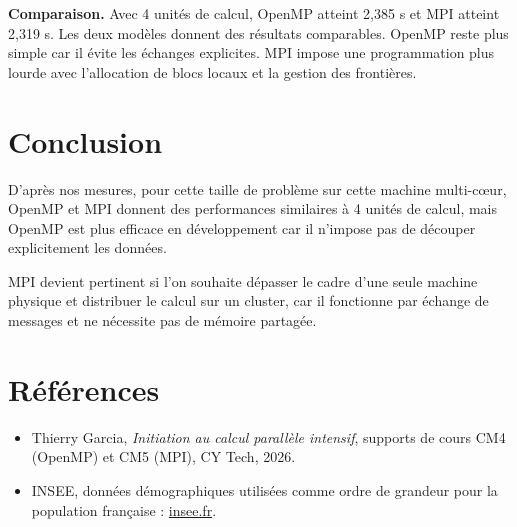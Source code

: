 \documentclass[a4paper,12pt]{article}
\begin{document}
\textbf{Comparaison.} Avec 4 unités de calcul, OpenMP atteint 2,385 s et MPI atteint 2,319 s. Les deux modèles donnent des résultats comparables. OpenMP reste plus simple car il évite les échanges explicites. MPI impose une programmation plus lourde avec l'allocation de blocs locaux et la gestion des frontières.
 
\section{Conclusion}
 
D'après nos mesures, pour cette taille de problème sur cette machine multi-cœur, OpenMP et MPI donnent des performances similaires à 4 unités de calcul, mais OpenMP est plus efficace en développement car il n'impose pas de découper explicitement les données.
 
MPI devient pertinent si l'on souhaite dépasser le cadre d'une seule machine physique et distribuer le calcul sur un cluster, car il fonctionne par échange de messages et ne nécessite pas de mémoire partagée.

\newpage
\section{Références}

\begin{itemize}
	\item Thierry Garcia, \textit{Initiation au calcul parallèle intensif},
	supports de cours CM4 (OpenMP) et CM5 (MPI), CY Tech, 2026.
	\item INSEE, données démographiques utilisées comme ordre de grandeur pour
	la population française :
	\href{https://www.insee.fr/fr/statistiques/8721456}{insee.fr}.
\end{itemize}
\end{document}
